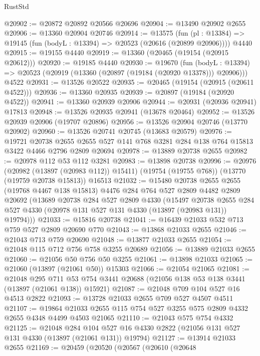 \begin{lexlean}{RustStd}
\begin{coremodule}
@20902 := @20872 @20892 @20566 @20696
@20904 := @13490 @20902 @2655
@20906 := @13360 @20904 @20746
@20914 := @13575
    (fun (pl : @13384) => @19145 (fun (bodyL : @13394) => @20523 (@20616 (@20899 @20906))))
    @4440
@20915 := @19155 @4440
@20919 := @13360 (@20465 (@19154 (@20915 @20612)))
@20920 := @19185 @4440
@20930 := @19670
    (fun (bodyL : @13394) => @20523 (@20919 (@13360 (@20897 (@19184 (@20920 @13378))) @20906)))
    @4522
@20931 := @13526 @20522
@20935 := @20465 (@19154 (@20915 (@20611 @4522)))
@20936 := @13360 @20935
@20939 := @20897 (@19184 (@20920 @4522))
@20941 := @13360 @20939 @20906
@20944 := @20931 (@20936 @20941) @17813
@20948 := @13526 @20935 @20941 (@13678 @20464)
@20952 := @13526 @20939 @20906 (@19707 @20896)
@20956 := @13526 @20904 @20746 (@13770 @20902)
@20960 := @13526 @20741 @20745 (@13683 @20579)
@20976 := @19721
    @20738
    @2655
    @2655
    @527
    @141
    @768
    @3281
    @284
    @138
    @764
    @15813
    @3422
    @4466
    @2796
    @2809
    @20694
@20978 := @13889 @20738 @2655
@20982 := @20978 @112 @53 @112 @3281
@20983 := @13898 @20738
@20996 := @20976
    (@20982 (@13897 (@20983 @112)) @15411)
    (@19754 (@19755 @768))
    (@13770 (@19759 @20738 @15813))
    @16513
@21032 := @15480
    @20738
    @2655
    @2655
    (@19768 @4467 @138 @15813)
    @4476
    @284
    @764
    @527
    @2809
    @4482
    @2809
    @20692
    (@13689
      @20738
      @284
      @527
      @2809
      @4330
      (@15497
        @20738
        @2655
        @284
        @527
        @4330
        (@20978 @131 @527 @131 @4330 (@13897 (@20983 @131)) @19794)))
@21033 := @15816 @20738
@21041 := @16439 @21033 @532 @713 @759 @527 @2809 @20690 @770
@21043 := @13868 @21033 @2655
@21046 := @21043 @713 @759 @20690
@21048 := @13877 @21033 @2655
@21054 := @21048 @115 @712 @756 @758 @3255 @20689
@21056 := @13889 @21033 @2655
@21060 := @21056 @50 @756 @50 @3255
@21061 := @13898 @21033
@21065 := @21060 (@13897 (@21061 @50)) @15303
@21066 := @21054 @21065
@21081 := @21048
    @295
    @711
    @53
    @754
    @3441
    @20688
    (@21056 @138 @53 @138 @3441 (@13897 (@21061 @138)) @15921)
@21087 := @21048 @709 @104 @527 @16 @4513 @2822
@21093 := @13728 @21033 @2655 @709 @527 @4507 @4511
@21107 := @19864 @21033 @2655 @115 @754 @527 @3255 @575 @2809 @4332 @2655 @4348 @4499 @4503 @21065
@21110 := @21043 @575 @754 @4332
@21125 := @21048
    @284
    @104
    @527
    @16
    @4330
    @2822
    (@21056 @131 @527 @131 @4330 (@13897 (@21061 @131)) @19794)
@21127 := @13914 @21033 @2655
@21169 := @20459
    (@20520
      (@20567
        (@20610
          (@20648

\end{coremodule}
\end{lexlean}
